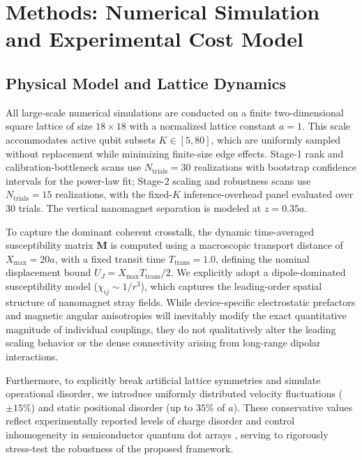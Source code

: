 \documentclass[a4paper,twocolumn,11pt]{quantumarticle}
\begin{document}
\section*{Methods: Numerical Simulation and Experimental Cost Model}

\subsection*{Physical Model and Lattice Dynamics}
All large-scale numerical simulations are conducted on a finite two-dimensional square lattice of size $18 \times 18$ with a normalized lattice constant $a=1$. This scale accommodates active qubit subsets $K \in [5,80]$, which are uniformly sampled without replacement while minimizing finite-size edge effects. Stage-1 rank and calibration-bottleneck scans use $N_{\text{trials}}=30$ realizations with bootstrap confidence intervals for the power-law fit; Stage-2 scaling and robustness scans use $N_{\text{trials}}=15$ realizations, with the fixed-$K$ inference-overhead panel evaluated over 30 trials. The vertical nanomagnet separation is modeled at $z=0.35a$. 

To capture the dominant coherent crosstalk, the dynamic time-averaged susceptibility matrix $\mathbf{M}$ is computed using a macroscopic transport distance of $X_{\max} = 20a$, with a fixed transit time $T_{\text{trans}} = 1.0$, defining the nominal displacement bound $U_J = X_{\max}T_{\text{trans}}/2$. We explicitly adopt a dipole-dominated susceptibility model ($\chi_{ij} \sim 1/r^3$), which captures the leading-order spatial structure of nanomagnet stray fields. While device-specific electrostatic prefactors and magnetic angular anisotropies will inevitably modify the exact quantitative magnitude of individual couplings, they do not qualitatively alter the leading scaling behavior or the dense connectivity arising from long-range dipolar interactions. 

Furthermore, to explicitly break artificial lattice symmetries and simulate operational disorder, we introduce uniformly distributed velocity fluctuations ($\pm 15\%$) and static positional disorder (up to $35\%$ of $a$). These conservative values reflect experimentally reported levels of charge disorder and control inhomogeneity in semiconductor quantum dot arrays \cite{yoneda_quantum-dot_2018, struck_low-frequency_2020}, serving to rigorously stress-test the robustness of the proposed framework.
\end{document}
